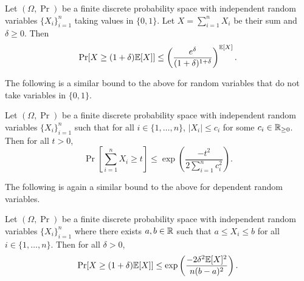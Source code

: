 \begin{theorem}
    Let $(\Omega, \Pr)$ be a finite discrete probability space with independent random variables $\{X_i\}_{i=1}^n$ taking values in $\{0,1\}$. Let $X = \sum_{i=1}^n X_i$ be their sum and $\delta \geq 0$. Then
    \[ \Pr[X \geq (1 + \delta)\mathbb E[X]] \leq \left( \frac{e^{\delta}}{(1+\delta)^{1 + \delta}} \right)^{\mathbb E[X]}. \]
\end{theorem}

The following is a similar bound to the above for random variables that do not take variables in $\{0,1\}$. 

\begin{theorem}
    Let $(\Omega, \Pr)$ be a finite discrete probability space with independent random variables $\{X_i\}_{i=1}^n$ such that for all $i \in \{1, \ldots, n\}$, $\lvert X_i \rvert \leq c_i$ for some $c_i \in \mathbb R_{\geq 0}$. Then for all $t > 0$,
    \[ \Pr\left[\sum_{i=1}^n X_i \geq t\right] \leq \exp\left(\frac{-t^2}{2\sum_{i=1}^n c_i^2}\right). \]
\end{theorem}

The following is again a similar bound to the above for dependent random variables.

\begin{theorem}
    Let $(\Omega, \Pr)$ be a finite discrete probability space with independent random variables $\{X_i\}_{i=1}^n$ where there exists $a, b \in \mathbb R$ such that $a \leq X_i \leq b$ for all $i \in \{1, \ldots, n\}$. Then for all $\delta > 0$,
    \[\Pr[X \geq (1 + \delta)\mathbb E[X]] \leq \exp\left(\frac{-2\delta^2\mathbb E[X]^2}{n(b-a)^2}\right). \]
\end{theorem}